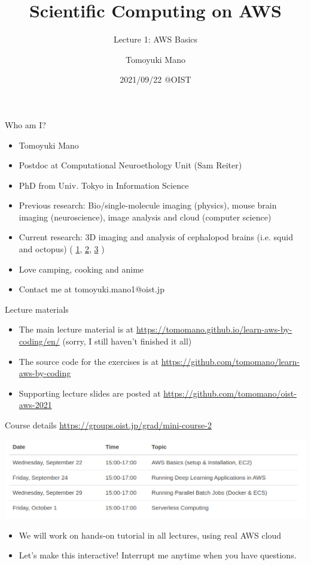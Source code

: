 \documentclass[unicode,11pt]{beamer}
\title{Scientific Computing on AWS}
\subtitle{Lecture 1: AWS Basics}
\author{Tomoyuki Mano}
\institute[OIST]{Okinawa Institute of Science and Technology}
\date{2021/09/22 @OIST}
\begin{document}
\frame{\titlepage}

\begin{frame}{Who am I?}

\begin{itemize}
    \item Tomoyuki Mano
    \item Postdoc at Computational Neuroethology Unit (Sam Reiter)
    \item PhD from Univ. Tokyo in Information Science
    \item Previous research: Bio/single-molecule imaging (physics), mouse brain imaging (neuroscience), image analysis and cloud (computer science)
    \item Current research: 3D imaging and analysis of cephalopod brains (i.e. squid and octopus)
    (
    \href{https://twitter.com/CephWarden/status/1142083856893263872}{1},
    \href{https://twitter.com/CephWarden/status/1384644335069667334}{2},
    \href{https://twitter.com/CephWarden/status/1232307456346181632}{3}
    )
    \item Love camping, cooking and anime
    \item Contact me at tomoyuki.mano1@oist.jp
\end{itemize}
\end{frame}

\begin{frame}{Lecture materials}
\begin{itemize}
    \item The main lecture material is at
    \url{https://tomomano.github.io/learn-aws-by-coding/en/}
    (sorry, I still haven't finished it all)
    \item The source code for the exercises is at
    \url{https://github.com/tomomano/learn-aws-by-coding}
    \item Supporting lecture slides are posted at
    \url{https://github.com/tomomano/oist-aws-2021}
\end{itemize}
\end{frame}

\begin{frame}{Course details}
\centering
\url{https://groups.oist.jp/grad/mini-course-2}

\vspace{10pt}

\includegraphics[width=1.0\textwidth]{imgs/schedule.png}

\begin{itemize}
    \item We will work on hands-on tutorial in all lectures, using real AWS cloud
    \item Let's make this interactive! Interrupt me anytime when you have questions.
\end{itemize}
\end{frame}
\end{document}
